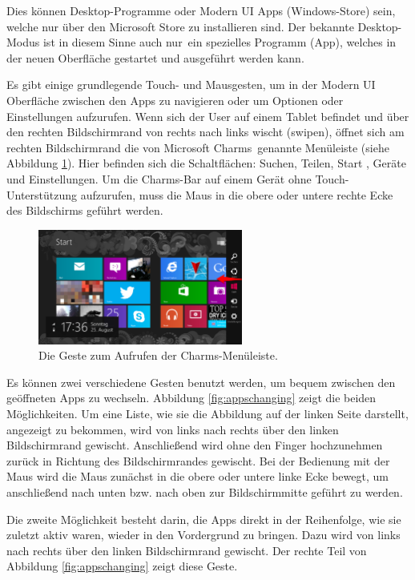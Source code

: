\documentclass[12pt,a4paper,bibtotoc,abstracton]{scrartcl}
\begin{document}
Dies können Desktop-Programme oder Modern UI Apps (Windows-Store) sein, welche nur über den Microsoft Store zu installieren sind. Der bekannte Desktop-Modus ist in diesem Sinne auch \glqq nur\grqq\ ein spezielles Programm (App), welches in der neuen Oberfläche gestartet und ausgeführt werden kann.

Es gibt einige grundlegende Touch- und Mausgesten, um in der Modern UI Oberfläche zwischen den Apps zu navigieren oder um Optionen oder Einstellungen aufzurufen. Wenn sich der User auf einem Tablet befindet und über den rechten Bildschirmrand von rechts nach links wischt (swipen), öffnet sich am rechten Bildschirmrand die von Microsoft \glqq Charms\grqq\ genannte Menüleiste (siehe Abbildung \ref{fig:charms}). Hier befinden sich die Schaltflächen: Suchen, Teilen, Start , Geräte und Einstellungen. Um die Charms-Bar auf einem Gerät ohne Touch-Unterstützung aufzurufen, muss die Maus in die obere oder untere rechte Ecke des Bildschirms geführt werden. 

\begin{figure}[h]	
	\centering
	\includegraphics[width=0.6\textwidth]{Bilder/Screenshots/windows8/charm_bar.png} 
	\caption{Die Geste zum Aufrufen der Charms-Menüleiste.}
	\label{fig:charms}
\end{figure}  

Es können zwei verschiedene Gesten benutzt werden, um bequem zwischen den geöffneten Apps zu wechseln. Abbildung \ref{fig:appschanging} zeigt die beiden Möglichkeiten. Um eine Liste, wie sie die Abbildung auf der linken Seite darstellt, angezeigt zu bekommen, wird von links nach rechts über den linken Bildschirmrand gewischt. Anschließend wird ohne den Finger hochzunehmen zurück in Richtung des Bildschirmrandes gewischt. Bei der Bedienung mit der Maus wird die Maus zunächst in die obere oder untere linke Ecke bewegt, um anschließend nach unten bzw. nach oben zur Bildschirmmitte geführt zu werden.

Die zweite Möglichkeit besteht darin, die Apps direkt in der Reihenfolge, wie sie zuletzt aktiv waren, wieder in den Vordergrund zu bringen. Dazu wird von links nach rechts über den linken Bildschirmrand gewischt. Der rechte Teil von Abbildung \ref{fig:appschanging} zeigt diese Geste.
 
\end{document}
